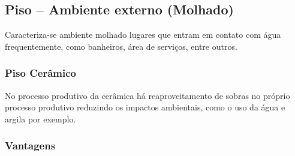 \subsection{Piso – Ambiente externo (Molhado)}

        Caracteriza-se ambiente molhado lugares que entram em contato com água frequentemente, como banheiros, área de serviços, entre outros.

\subsubsection*{\textbf{Piso Cerâmico}}

	No processo produtivo da cerâmica há reaproveitamento de sobras no próprio processo produtivo reduzindo os impactos ambientais, como o uso da água e argila por exemplo.

\subsubsection*{\textbf{Vantagens}}

